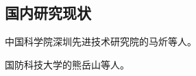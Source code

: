 %
%

\subsection{国内研究现状}
\label{sec1-3-2}

中国科学院深圳先进技术研究院的马炘等人\cite{Ma2010SIAT}。

国防科技大学的熊岳山等人\cite{Tan2012NUDT}。

